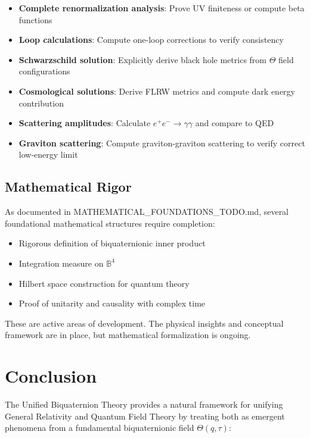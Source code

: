 \documentclass[12pt]{article}
\begin{document}
\begin{itemize}
    \item[$\square$] \textbf{Complete renormalization analysis}: Prove UV finiteness or compute beta functions
    \item[$\square$] \textbf{Loop calculations}: Compute one-loop corrections to verify consistency
    \item[$\square$] \textbf{Schwarzschild solution}: Explicitly derive black hole metrics from $\Theta$ field configurations
    \item[$\square$] \textbf{Cosmological solutions}: Derive FLRW metrics and compute dark energy contribution
    \item[$\square$] \textbf{Scattering amplitudes}: Calculate $e^+e^- \to \gamma\gamma$ and compare to QED
    \item[$\square$] \textbf{Graviton scattering}: Compute graviton-graviton scattering to verify correct low-energy limit
\end{itemize}

\subsection{Mathematical Rigor}

As documented in MATHEMATICAL\_FOUNDATIONS\_TODO.md, several foundational mathematical structures require completion:
\begin{itemize}
    \item Rigorous definition of biquaternionic inner product
    \item Integration measure on $\mathbb{B}^4$
    \item Hilbert space construction for quantum theory
    \item Proof of unitarity and causality with complex time
\end{itemize}

These are active areas of development. The physical insights and conceptual framework are in place, but mathematical formalization is ongoing.

\section{Conclusion}

The Unified Biquaternion Theory provides a natural framework for unifying General Relativity and Quantum Field Theory by treating both as emergent phenomena from a fundamental biquaternionic field $\Theta(q,\tau)$:
\end{document}
